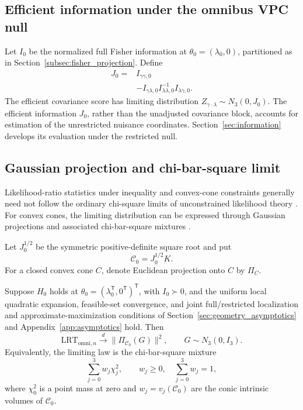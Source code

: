 \subsection{Efficient information under the omnibus VPC null}
\label{subsec:global_efficient_information}
Let $I_0$ be the normalized full Fisher information at
$\theta_0=(\lambda_0,0)$, partitioned as in
Section~\ref{subsec:fisher_projection}. Define
\begin{equation}\label{eq:sec5-J}
 \begin{aligned}
 J_0={}&I_{\gamma\gamma,0}\\
 &-I_{\gamma\lambda,0}
 I_{\lambda\lambda,0}^{-1}I_{\lambda\gamma,0}.
 \end{aligned}
\end{equation}
The efficient covariance score has limiting distribution
$Z_{\gamma\cdot\lambda}\sim N_3(0,J_0)$.
The efficient information $J_0$, rather than the unadjusted
covariance block, accounts for estimation of the unrestricted nuisance
coordinates. Section~\ref{sec:information} develops its evaluation
under the restricted null.


\subsection{Gaussian projection and chi-bar-square limit}
\label{subsec:global_chibar_limit}

Likelihood-ratio statistics under inequality and
convex-cone constraints generally need not follow
the ordinary chi-square limits of unconstrained
likelihood theory \citep{self1987asymptotic,shapiro1985}.
For convex cones, the limiting distribution can
be expressed through Gaussian projections and
associated chi-bar-square mixtures
\citep{amelunxen2014}.

Let $J_0^{1/2}$ be the symmetric positive-definite
square root and put
\begin{equation}
\mathcal C_0=J_0^{1/2}K.
\label{eq:sec5-transformed-cone}
\end{equation}
For a closed convex cone $C$, denote Euclidean
projection onto $C$ by $\Pi_C$.


\begin{theorem}\label{thm:sec5-global-lrt}
Suppose $H_0$ holds at $\theta_0=(\lambda_0^{\mathsf T},0^{\mathsf T})^{\mathsf T}$,
with $I_0\succ0$, and the uniform local quadratic expansion,
feasible-set convergence, and joint full/restricted localization
and approximate-maximization conditions of
Section~\ref{sec:geometry_asymptotics} and
Appendix~\ref{app:asymptotics} hold. Then
\begin{equation}\label{eq:sec5-lrt-limit}
 \mathrm{LRT}_{\mathrm{omni},n}\xrightarrow{d}
 \|\Pi_{\mathcal C_0}(G)\|^2,
 \qquad G\sim N_3(0,I_3).
\end{equation}
Equivalently, the limiting law is the chi-bar-square mixture
\begin{equation}\label{eq:sec5-chibar}
 \sum_{j=0}^{3}w_j\chi_j^2,
 \qquad w_j\geq0,\quad\sum_{j=0}^{3}w_j=1,
\end{equation}
where $\chi_0^2$ is a point mass at zero and
$w_j=v_j(\mathcal C_0)$ are the conic intrinsic volumes of
$\mathcal C_0$.
\end{theorem}

